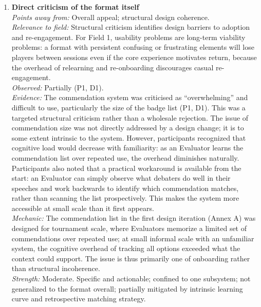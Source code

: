 \documentclass[12pt]{article}
\begin{document}
\begin{enumerate}
\item \textbf{Direct criticism of the format itself}\\
\textit{Points away from:} Overall appeal; structural design coherence.\\
\textit{Relevance to field:} Structural criticism identifies design barriers to adoption and re-engagement. For Field 1, usability problems are long-term viability problems: a format with persistent confusing or frustrating elements will lose players between sessions even if the core experience motivates return, because the overhead of relearning and re-onboarding discourages casual re-engagement.\\
\textit{Observed:} Partially (P1, D1).\\
\textit{Evidence:} The commendation system was criticised as ``overwhelming'' and difficult to use, particularly the size of the badge list (P1, D1). This was a targeted structural criticism rather than a wholesale rejection. The issue of commendation size was not directly addressed by a design change; it is to some extent intrinsic to the system. However, participants recognized that cognitive load would decrease with familiarity: as an Evaluator learns the commendation list over repeated use, the overhead diminishes naturally. Participants also noted that a practical workaround is available from the start: an Evaluator can simply observe what debaters do well in their speeches and work backwards to identify which commendation matches, rather than scanning the list prospectively. This makes the system more accessible at small scale than it first appears.\\
\textit{Mechanic:} The commendation list in the first design iteration (Annex A) was designed for tournament scale, where Evaluators memorize a limited set of commendations over repeated use; at small informal scale with an unfamiliar system, the cognitive overhead of tracking all options exceeded what the context could support. The issue is thus primarily one of onboarding rather than structural incoherence.\\
\textit{Strength:} Moderate. Specific and actionable; confined to one subsystem; not generalized to the format overall; partially mitigated by intrinsic learning curve and retrospective matching strategy.


\end{enumerate}
\end{document}
